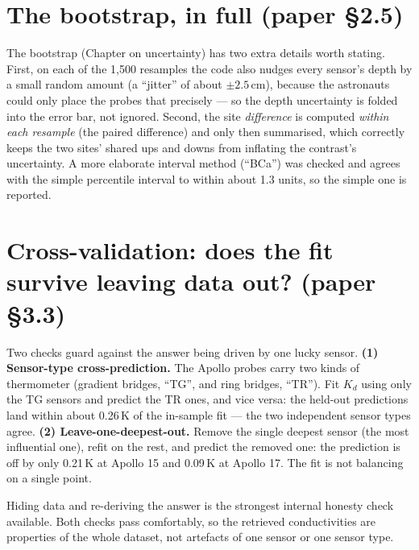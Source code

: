 \documentclass[11pt]{article}
\begin{document}
\section{The bootstrap, in full (paper \S2.5)}
The bootstrap (Chapter on uncertainty) has two extra details worth
stating. First, on each of the 1{,}500 resamples the code also nudges
every sensor's depth by a small random amount (a ``jitter'' of about
$\pm2.5$\,cm), because the astronauts could only place the probes that
precisely --- so the depth uncertainty is folded into the error bar, not
ignored. Second, the site \emph{difference} is computed \emph{within each
resample} (the paired difference) and only then summarised, which
correctly keeps the two sites' shared ups and downs from inflating the
contrast's uncertainty. A more elaborate interval method (``BCa'')
was checked and agrees with the simple percentile interval to within
about 1.3 units, so the simple one is reported.

\section{Cross-validation: does the fit survive leaving data out? (paper \S3.3)}
Two checks guard against the answer being driven by one lucky sensor.
\textbf{(1) Sensor-type cross-prediction.} The Apollo probes carry two
kinds of thermometer (gradient bridges, ``TG'', and ring bridges,
``TR''). Fit $K_d$ using only the TG sensors and predict the TR ones, and
vice versa: the held-out predictions land within about 0.26\,K of the
in-sample fit --- the two independent sensor types agree.
\textbf{(2) Leave-one-deepest-out.} Remove the single deepest sensor (the
most influential one), refit on the rest, and predict the removed one:
the prediction is off by only 0.21\,K at Apollo 15 and 0.09\,K at Apollo
17. The fit is not balancing on a single point.

\begin{keybox}
Hiding data and re-deriving the answer is the strongest internal honesty
check available. Both checks pass comfortably, so the retrieved
conductivities are properties of the whole dataset, not artefacts of one
sensor or one sensor type.
\end{keybox}
\end{document}
